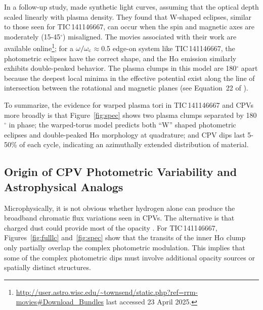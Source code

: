 \documentclass[11pt,twocolumn,tighten,linenumbers]{aastex7}
\begin{document}
In a follow-up study, \citet{Townsend2008} made synthetic light
curves, assuming that the optical depth scaled linearly with plasma
density.  They found that W-shaped eclipses, similar to those seen for
TIC\,141146667, can occur when the spin and magnetic axes are
moderately (15-45$^\circ$) misaligned.  The movies associated with
their work are available
online\footnote{\url{http://user.astro.wisc.edu/\~townsend/static.php?ref=rrm-movies\#Download\_Bundles}
last accessed 23 April 2025.}; for a $\omega/\omega_{\rm
c}$$\approx$0.5 edge-on system like TIC\,141146667, the photometric
eclipses have the correct shape, and the H$\alpha$ emission similarly
exhibits double-peaked behavior.  The plasma clumps in this model are
180$^\circ$ apart because the deepest local minima in the effective
potential exist along the line of intersection between the rotational
and magnetic planes (see Equation~22 of \citealt{Townsend2005}).  

To summarize, the evidence for warped plasma tori in TIC\,141146667
and CPVs more broadly is that Figure~\ref{fig:spec} shows two plasma
clumps separated by 180$^\circ$ in phase; the warped-torus model
predicts both ``W'' shaped photometric eclipses and double-peaked
H$\alpha$ morphology at quadrature; and CPV dips last 5-50\% of each
cycle, indicating an azimuthally extended distribution of material.

\subsection{Origin of CPV Photometric Variability and Astrophysical Analogs}

Microphysically, it is not obvious whether hydrogen alone can produce
the broadband chromatic flux variations seen in CPVs.  The alternative
is that charged dust could provide most of the opacity
\citep{Sanderson2023}.  For TIC\,141146667, Figures~\ref{fig:fulllc}
and~\ref{fig:spec} show that the transits of the inner H$\alpha$ clump
only partially overlap the complex photometric modulation.  This
implies that some of the complex photometric dips must involve
additional opacity sources or spatially distinct structures.
\end{document}
